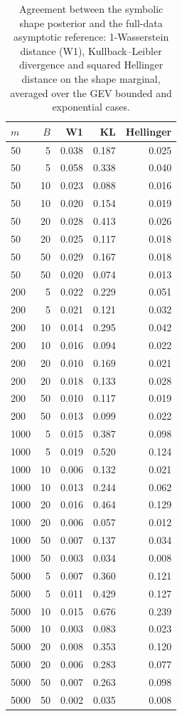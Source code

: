 \begin{table}[t]
\centering
\small
\caption{Agreement between the symbolic shape posterior and the full-data asymptotic reference: 1-Wasserstein distance (W1), Kullback--Leibler divergence and squared Hellinger distance on the shape marginal, averaged over the GEV bounded and exponential cases.}
\label{tab:sim-approx}
\begin{tabular}{lrrrr}
\toprule
$m$ & $B$ & W1 & KL & Hellinger \\
\midrule
  50 &    5 & 0.038 & 0.187 & 0.025 \\
  50 &    5 & 0.058 & 0.338 & 0.040 \\
  50 &   10 & 0.023 & 0.088 & 0.016 \\
  50 &   10 & 0.020 & 0.154 & 0.019 \\
  50 &   20 & 0.028 & 0.413 & 0.026 \\
  50 &   20 & 0.025 & 0.117 & 0.018 \\
  50 &   50 & 0.029 & 0.167 & 0.018 \\
  50 &   50 & 0.020 & 0.074 & 0.013 \\
 200 &    5 & 0.022 & 0.229 & 0.051 \\
 200 &    5 & 0.021 & 0.121 & 0.032 \\
 200 &   10 & 0.014 & 0.295 & 0.042 \\
 200 &   10 & 0.016 & 0.094 & 0.022 \\
 200 &   20 & 0.010 & 0.169 & 0.021 \\
 200 &   20 & 0.018 & 0.133 & 0.028 \\
 200 &   50 & 0.010 & 0.117 & 0.019 \\
 200 &   50 & 0.013 & 0.099 & 0.022 \\
1000 &    5 & 0.015 & 0.387 & 0.098 \\
1000 &    5 & 0.019 & 0.520 & 0.124 \\
1000 &   10 & 0.006 & 0.132 & 0.021 \\
1000 &   10 & 0.013 & 0.244 & 0.062 \\
1000 &   20 & 0.016 & 0.464 & 0.129 \\
1000 &   20 & 0.006 & 0.057 & 0.012 \\
1000 &   50 & 0.007 & 0.137 & 0.034 \\
1000 &   50 & 0.003 & 0.034 & 0.008 \\
5000 &    5 & 0.007 & 0.360 & 0.121 \\
5000 &    5 & 0.011 & 0.429 & 0.127 \\
5000 &   10 & 0.015 & 0.676 & 0.239 \\
5000 &   10 & 0.003 & 0.083 & 0.023 \\
5000 &   20 & 0.008 & 0.353 & 0.120 \\
5000 &   20 & 0.006 & 0.283 & 0.077 \\
5000 &   50 & 0.007 & 0.263 & 0.098 \\
5000 &   50 & 0.002 & 0.035 & 0.008 \\
\bottomrule
\end{tabular}
\end{table}
